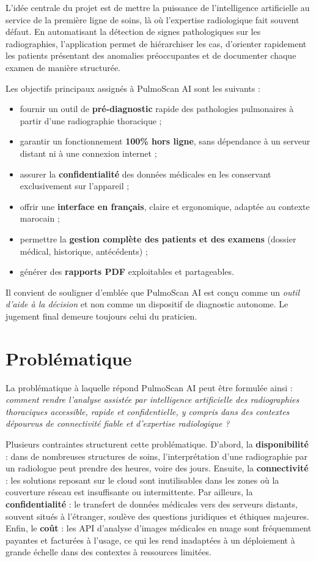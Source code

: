 \documentclass[12pt,a4paper]{report}
\begin{document}
\medskip
L'idée centrale du projet est de mettre la puissance de l'intelligence artificielle au service de la première ligne de soins, là où l'expertise radiologique fait souvent défaut. En automatisant la détection de signes pathologiques sur les radiographies, l'application permet de hiérarchiser les cas, d'orienter rapidement les patients présentant des anomalies préoccupantes et de documenter chaque examen de manière structurée.

\medskip
Les objectifs principaux assignés à PulmoScan AI sont les suivants :
\begin{itemize}
  \item fournir un outil de \textbf{pré-diagnostic} rapide des pathologies pulmonaires à partir d'une radiographie thoracique ;
  \item garantir un fonctionnement \textbf{100\% hors ligne}, sans dépendance à un serveur distant ni à une connexion internet ;
  \item assurer la \textbf{confidentialité} des données médicales en les conservant exclusivement sur l'appareil ;
  \item offrir une \textbf{interface en français}, claire et ergonomique, adaptée au contexte marocain ;
  \item permettre la \textbf{gestion complète des patients et des examens} (dossier médical, historique, antécédents) ;
  \item générer des \textbf{rapports PDF} exploitables et partageables.
\end{itemize}

\medskip
Il convient de souligner d'emblée que PulmoScan AI est conçu comme un \emph{outil d'aide à la décision} et non comme un dispositif de diagnostic autonome. Le jugement final demeure toujours celui du praticien.

\section{Problématique}
La problématique à laquelle répond PulmoScan AI peut être formulée ainsi : \emph{comment rendre l'analyse assistée par intelligence artificielle des radiographies thoraciques accessible, rapide et confidentielle, y compris dans des contextes dépourvus de connectivité fiable et d'expertise radiologique ?}

\medskip
Plusieurs contraintes structurent cette problématique. D'abord, la \textbf{disponibilité} : dans de nombreuses structures de soins, l'interprétation d'une radiographie par un radiologue peut prendre des heures, voire des jours. Ensuite, la \textbf{connectivité} : les solutions reposant sur le cloud sont inutilisables dans les zones où la couverture réseau est insuffisante ou intermittente. Par ailleurs, la \textbf{confidentialité} : le transfert de données médicales vers des serveurs distants, souvent situés à l'étranger, soulève des questions juridiques et éthiques majeures. Enfin, le \textbf{coût} : les API d'analyse d'images médicales en nuage sont fréquemment payantes et facturées à l'usage, ce qui les rend inadaptées à un déploiement à grande échelle dans des contextes à ressources limitées.
\end{document}
